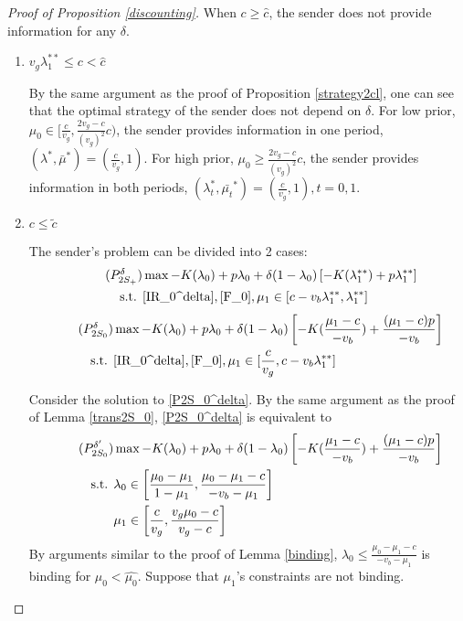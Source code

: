 \documentclass[11pt]{extarticle}
\begin{document}
\begin{proof}[Proof of Proposition \ref{discounting}]
	When $c \geq \widehat{c}$, the sender does not provide information for any $\delta$.
	\begin{enumerate}[(1)]
		\item $v_g\lambda_1^{**} \leq c < \widehat{c}$
		
		By the same argument as the proof of Proposition \ref{strategy2cl}, one can see that the optimal strategy of the sender does not depend on $\delta$. For low prior, $\mu_0 \in [\frac{c}{v_g}, \frac{2 v_g-c}{(v_g)^2} c)$, the sender provides information in one period, $(\lambda^*,\bar{\mu}^*)=(\frac{c}{v_g},1)$. For high prior, $\mu_0 \geq \frac{2 v_g-c}{(v_g)^2} c$, the sender provides information in both periods, $(\lambda_t^*,\bar{\mu_t}^*)=(\frac{c}{v_g},1),t=0,1$.
		
		\item $c \leq \tilde{c}$
		
		The sender's problem can be divided into 2 cases:
		\begin{align}\tag{$P_{2S_+}^\delta$} \label{P2S_+^delta}
		& \max -K(\lambda_0) + p \lambda_0 + \delta (1-\lambda_0) \left[-K(\lambda_1^{**})+p \lambda_1^{**}\right] \nonumber\\
		\text{s.t. } &\eqref{IR_0^delta},\eqref{F_0}, \mu_1\in [c - v_b \lambda_1^{**}, \lambda_1^{**}] \nonumber
		\end{align}
		\begin{align}\tag{$P_{2S_0}^\delta$} \label{P2S_0^delta}
		& \max -K(\lambda_0) + p \lambda_0 + \delta (1-\lambda_0) \left[-K(\frac{\mu_1-c}{-v_b})+\frac{(\mu_1-c)p}{-v_b}\right] \nonumber\\
		\text{s.t. } &\eqref{IR_0^delta},\eqref{F_0}, \mu_1 \in [\frac{c}{v_g}, c - v_b \lambda_1^{**}]\nonumber
		\end{align}
		
		
		Consider the solution to \eqref{P2S_0^delta}. By the same argument as the proof of Lemma \ref{trans2S_0}, \eqref{P2S_0^delta} is equivalent to	\begin{align}\tag{$P_{2S_0}^{\delta'}$} \label{P2S_0^delta'}
		& \max -K(\lambda_0) + p \lambda_0 + \delta (1-\lambda_0) \left[-K(\frac{\mu_1-c}{-v_b})+\frac{(\mu_1-c)p}{-v_b}\right] \nonumber\\
		\text{s.t. } &\lambda_0 \in \left[\frac{\mu_0-\mu_1}{1-\mu_1}, \frac{\mu_0-\mu_1-c}{-v_b-\mu_1}\right] \nonumber\\
		&\mu_1\in \left[\frac{c}{v_g}, \frac{v_g\mu_0-c}{v_g-c} \right] \nonumber
		\end{align} 
		By arguments similar to the proof of Lemma \ref{binding}, $\lambda_0 \leq \frac{\mu_0-\mu_1-c}{-v_b-\mu_1}$ is binding 	for $\mu_0 < \widehat{\mu_0}$. Suppose that $\mu_1$'s constraints are not binding.


\end{enumerate}
\end{proof}
\end{document}
